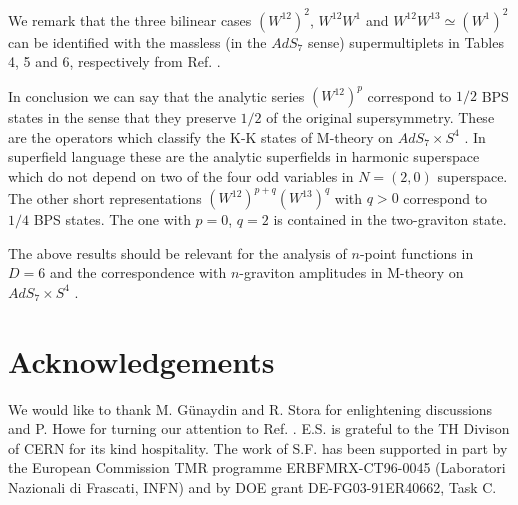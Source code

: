 \documentclass[a4paper,12pt]{article}
\begin{document}
We remark that the three bilinear cases $(W^{12})^2$, $W^{12}W^1$ 
and $ W^{12}W^{13} \simeq (W^1)^2$ can be identified with the 
massless (in the $AdS_7$ sense) supermultiplets in Tables 4, 5 and 
6, respectively from Ref. \cite{GT}. 
  

 
In conclusion we can say that the analytic series $(W^{12})^p$ 
correspond to $1/2$ BPS states in the sense that they preserve 
$1/2$ of the original supersymmetry.  These are the operators 
which classify the K-K states of M-theory on $AdS_7\times S^4$ 
\cite{GNW}. In superfield language  these are the analytic 
superfields in harmonic superspace which do not depend on two of 
the four odd variables in $N=(2,0)$ superspace. The other short 
representations  $(W^{12})^{p+q}(W^{13})^{q}$ with $q>0$ 
correspond to  $1/4$ BPS states. The one with $p=0$, $q=2$ is 
contained in the two-graviton state. 

The above results should be relevant for the analysis of $n$-point 
functions in $D=6$ and the correspondence with $n$-graviton 
amplitudes in M-theory on $AdS_7\times S^4$ \cite{C,B}. 



 

 

 \section*{Acknowledgements}

We would like to thank M. G\"unaydin and R. Stora for enlightening 
discussions and P. Howe for turning our attention to Ref. 
\cite{Howe}. E.S. is grateful to the TH Divison of CERN for its 
kind hospitality. The work of S.F. has been supported in part by 
the European Commission TMR programme ERBFMRX-CT96-0045 
(Laboratori Nazionali di Frascati, INFN) and by DOE grant 
DE-FG03-91ER40662, Task C. 


\vfill\eject
\end{document}
